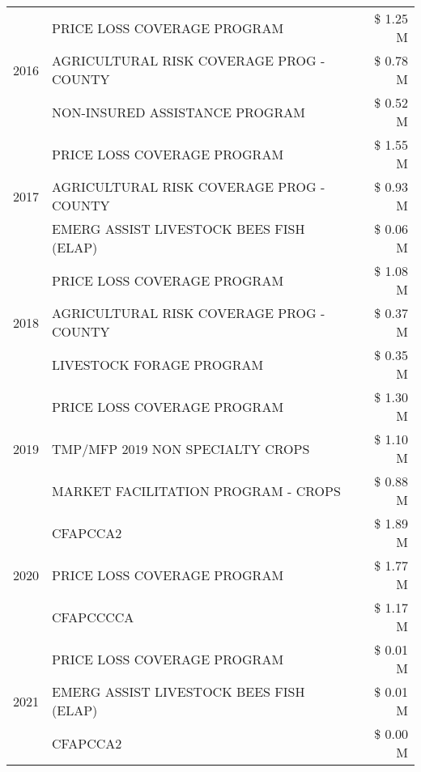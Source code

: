 \begin{tabular}{llr}
\cline{1-3}
\multirow[t]{3}{*}{2016} & PRICE LOSS COVERAGE PROGRAM                   & \$ 1.25 M \\
 & AGRICULTURAL RISK COVERAGE PROG - COUNTY      & \$ 0.78 M \\
 & NON-INSURED ASSISTANCE PROGRAM                & \$ 0.52 M \\
\cline{1-3}
\multirow[t]{3}{*}{2017} & PRICE LOSS COVERAGE PROGRAM & \$ 1.55 M \\
 & AGRICULTURAL RISK COVERAGE PROG - COUNTY & \$ 0.93 M \\
 & EMERG ASSIST LIVESTOCK BEES FISH (ELAP) & \$ 0.06 M \\
\cline{1-3}
\multirow[t]{3}{*}{2018} & PRICE LOSS COVERAGE PROGRAM & \$ 1.08 M \\
 & AGRICULTURAL RISK COVERAGE PROG - COUNTY & \$ 0.37 M \\
 & LIVESTOCK FORAGE PROGRAM & \$ 0.35 M \\
\cline{1-3}
\multirow[t]{3}{*}{2019} & PRICE LOSS COVERAGE PROGRAM & \$ 1.30 M \\
 & TMP/MFP 2019 NON SPECIALTY CROPS & \$ 1.10 M \\
 & MARKET FACILITATION PROGRAM - CROPS & \$ 0.88 M \\
\cline{1-3}
\multirow[t]{3}{*}{2020} & CFAPCCA2 & \$ 1.89 M \\
 & PRICE LOSS COVERAGE PROGRAM & \$ 1.77 M \\
 & CFAPCCCCA & \$ 1.17 M \\
\cline{1-3}
\multirow[t]{3}{*}{2021} & PRICE LOSS COVERAGE PROGRAM & \$ 0.01 M \\
 & EMERG ASSIST LIVESTOCK BEES FISH (ELAP) & \$ 0.01 M \\
 & CFAPCCA2 & \$ 0.00 M \\
\cline{1-3}
\bottomrule
\end{tabular}
